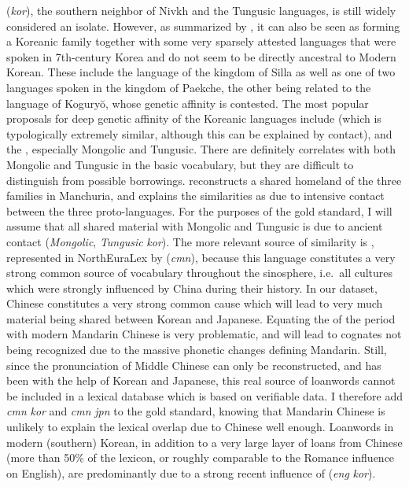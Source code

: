  (\textit{kor}), the southern neighbor of Nivkh and the Tungusic languages, is still widely considered an isolate. However, as summarized by \cite{beckwith2005}, it can also be seen as forming a Koreanic family together with some very sparsely attested languages that were spoken in 7th-century Korea and do not seem to be directly ancestral to Modern Korean. These include the language of the kingdom of Silla as well as one of two languages spoken in the kingdom of Paekche, the other being related to the language of Koguryŏ, whose genetic affinity is contested. The most popular proposals for deep genetic affinity of the Koreanic languages include  (which is typologically extremely similar, although this can be explained by contact), and the , especially Mongolic and Tungusic. There are definitely correlates with both Mongolic and Tungusic in the basic vocabulary, but they are difficult to distinguish from possible
borrowings. \cite{janhunen1996} reconstructs a shared homeland of the three families in Manchuria, and explains the similarities as due to intensive contact between the three proto-languages. For the purposes of the gold standard, I will assume that all shared material with Mongolic and Tungusic is due to ancient contact (\textit{Mongolic}, \textit{Tungusic} \arrowLA \textit{kor}). The more relevant source of similarity is , represented in NorthEuraLex by  (\textit{cmn}), because this language constitutes a very strong common source of vocabulary throughout the sinosphere, i.e.\ all cultures which were strongly influenced by China during their history. In our dataset, Chinese constitutes a very strong common cause which will lead to very much material being shared between Korean and Japanese. Equating the  of the period with modern Mandarin Chinese is very problematic, and will lead to cognates not being recognized due to the massive phonetic changes
defining Mandarin. Still, since the pronunciation of Middle Chinese can only be reconstructed, and has been with the help of Korean and Japanese, this real source of loanwords cannot be included in a lexical database which is based on verifiable data. I therefore add \textit{cmn} \arrowLA \textit{kor} and \textit{cmn} \arrowLA \textit{jpn} to the gold standard, knowing that Mandarin Chinese is unlikely to explain the lexical overlap due to Chinese well enough. Loanwords in modern (southern) Korean, in addition to a very large layer of loans from Chinese (more than 50\% of the lexicon, or roughly comparable to the Romance influence on English), are predominantly due to a strong recent influence of  (\textit{eng} \arrowLA \textit{kor}).

